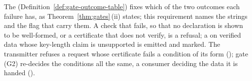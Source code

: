 
The  (Definition~\ref{def:gate-outcome-table}) fixes which
of the two outcomes each failure has, as Theorem~\ref{thm:gates}\,(ii) states;
this requirement names the strings and the flag that carry them. A check that
fails, so that no declaration is shown to be well-formed, or a certificate
that does not verify, is a refusal; a  on
verified data whose key-length claim is unsupported is emitted and marked. The
transmitter refuses a request whose certificate fails a condition of its form
(); gate (G2) re-decides the
conditions all the same, a consumer deciding the data it is handed
().

